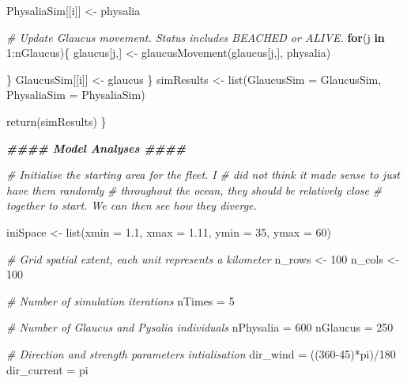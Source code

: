 \documentclass[
]{article}
\newenvironment{Shaded}{\begin{snugshade}}{\end{snugshade}}
\newcommand{\AttributeTok}[1]{\textcolor[rgb]{0.77,0.63,0.00}{#1}}
\newcommand{\CommentTok}[1]{\textcolor[rgb]{0.56,0.35,0.01}{\textit{#1}}}
\newcommand{\ControlFlowTok}[1]{\textcolor[rgb]{0.13,0.29,0.53}{\textbf{#1}}}
\newcommand{\DecValTok}[1]{\textcolor[rgb]{0.00,0.00,0.81}{#1}}
\newcommand{\DocumentationTok}[1]{\textcolor[rgb]{0.56,0.35,0.01}{\textbf{\textit{#1}}}}
\newcommand{\FloatTok}[1]{\textcolor[rgb]{0.00,0.00,0.81}{#1}}
\newcommand{\FunctionTok}[1]{\textcolor[rgb]{0.00,0.00,0.00}{#1}}
\newcommand{\NormalTok}[1]{#1}
\newcommand{\OtherTok}[1]{\textcolor[rgb]{0.56,0.35,0.01}{#1}}
\newcommand{\SpecialCharTok}[1]{\textcolor[rgb]{0.00,0.00,0.00}{#1}}
\newcommand{\StringTok}[1]{\textcolor[rgb]{0.31,0.60,0.02}{#1}}
\begin{document}
\begin{Shaded}
\begin{Highlighting}[]
\NormalTok{    PhysaliaSim[[i]] }\OtherTok{\textless{}{-}}\NormalTok{ physalia}
    
    
    \CommentTok{\# Update Glaucus movement. Status includes \textquotesingle{}BEACHED\textquotesingle{} or \textquotesingle{}ALIVE\textquotesingle{}.}
    \ControlFlowTok{for}\NormalTok{(j }\ControlFlowTok{in} \DecValTok{1}\SpecialCharTok{:}\NormalTok{nGlaucus)\{}
\NormalTok{      glaucus[j,] }\OtherTok{\textless{}{-}} \FunctionTok{glaucusMovement}\NormalTok{(glaucus[j,], physalia)}
      
\NormalTok{    \}}
\NormalTok{    GlaucusSim[[i]] }\OtherTok{\textless{}{-}}\NormalTok{ glaucus}
\NormalTok{  \}}
\NormalTok{  simResults }\OtherTok{\textless{}{-}} \FunctionTok{list}\NormalTok{(}\StringTok{\textquotesingle{}GlaucusSim\textquotesingle{}} \OtherTok{=}\NormalTok{ GlaucusSim,}
                     \StringTok{\textquotesingle{}PhysaliaSim\textquotesingle{}} \OtherTok{=}\NormalTok{ PhysaliaSim)}
  
  \FunctionTok{return}\NormalTok{(simResults)}
\NormalTok{\}}

\DocumentationTok{\#\#\#\# Model Analyses \#\#\#\#}

\CommentTok{\# Initialise the starting area for the fleet. I}
\CommentTok{\# did not think it made sense to just have them randomly}
\CommentTok{\# throughout the ocean, they should be relatively close}
\CommentTok{\# together to start. We can then see how they diverge.}

\NormalTok{iniSpace }\OtherTok{\textless{}{-}} \FunctionTok{list}\NormalTok{(}\AttributeTok{xmin =} \FloatTok{1.1}\NormalTok{,}
                 \AttributeTok{xmax =} \FloatTok{1.11}\NormalTok{,}
                 \AttributeTok{ymin =} \DecValTok{35}\NormalTok{,}
                 \AttributeTok{ymax =} \DecValTok{60}\NormalTok{)}

\CommentTok{\# Grid spatial extent, each unit represents a kilometer}
\NormalTok{n\_rows }\OtherTok{\textless{}{-}} \DecValTok{100}
\NormalTok{n\_cols }\OtherTok{\textless{}{-}} \DecValTok{100}

\CommentTok{\# Number of simulation iterations}
\NormalTok{nTimes }\OtherTok{=} \DecValTok{5}

\CommentTok{\# Number of Glaucus and Pysalia individuals}
\NormalTok{nPhysalia }\OtherTok{=} \DecValTok{600}
\NormalTok{nGlaucus }\OtherTok{=} \DecValTok{250}

\CommentTok{\# Direction and strength parameters intialisation}
\NormalTok{dir\_wind }\OtherTok{=}\NormalTok{ ((}\DecValTok{360{-}45}\NormalTok{)}\SpecialCharTok{*}\NormalTok{pi)}\SpecialCharTok{/}\DecValTok{180}
\NormalTok{dir\_current }\OtherTok{=}\NormalTok{ pi}


\end{Highlighting}
\end{Shaded}
\end{document}

